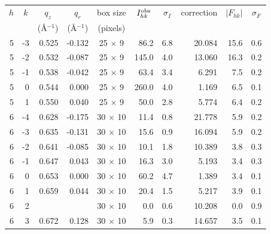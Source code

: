 \begin{table}[htbp]
  \centering
  \begin{tabular}{rrrrcrrrrr}
    \hline
    \multicolumn{1}{c}{$h$} & \multicolumn{1}{c}{$k$} & \multicolumn{1}{c}{$q_z$} & 
    \multicolumn{1}{c}{$q_r$} & \multicolumn{1}{c}{box size} & \multicolumn{1}{c}{$I_{hk}^\textrm{obs}$} & 
    \multicolumn{1}{c}{$\sigma_I$} & \multicolumn{1}{c}{correction} & \multicolumn{1}{c}{$|F_{hk}|$} &
    \multicolumn{1}{c}{$\sigma_F$} \\
     & & \multicolumn{1}{c}{(\AA$^{-1}$)} & \multicolumn{1}{c}{(\AA$^{-1}$)} & \multicolumn{1}{c}{(pixels)} & & & & \\ 
    \hline
  5        & -3       & 0.525    & -0.132   & 25 $\times$ 9  & 86.2     & 6.8      & 20.084    & 15.6     & 0.6 \\
  5        & -2       & 0.532    & -0.087   & 25 $\times$ 9  & 145.0    & 4.0      & 13.060    & 16.3     & 0.2 \\
  5        & -1       & 0.538    & -0.042   & 25 $\times$ 9  & 63.4     & 3.4      & 6.291     & 7.5      & 0.2 \\
  5        & 0        & 0.544    & 0.000    & 25 $\times$ 9  & 260.0    & 4.0      & 1.169     & 6.5      & 0.1 \\
  5        & 1        & 0.550    & 0.040    & 25 $\times$ 9  & 50.0     & 2.8      & 5.774     & 6.4      & 0.2 \\
  6        & -4       & 0.628    & -0.175   & 30 $\times$ 10 & 11.4     & 0.8      & 21.778    & 5.9      & 0.2 \\
  6        & -3       & 0.635    & -0.131   & 30 $\times$ 10 & 15.6     & 0.9      & 16.094    & 5.9      & 0.2 \\
  6        & -2       & 0.641    & -0.085   & 30 $\times$ 10 & 10.1     & 1.8      & 10.389    & 3.8      & 0.3 \\
  6        & -1       & 0.647    & 0.043    & 30 $\times$ 10 & 16.3     & 3.0      & 5.193     & 3.4      & 0.3 \\
  6        & 0        & 0.653    & 0.000    & 30 $\times$ 10 & 60.2     & 4.7      & 1.389     & 3.4      & 0.1 \\
  6        & 1        & 0.659    & 0.044    & 30 $\times$ 10 & 20.4     & 1.5      & 5.217     & 3.9      & 0.1 \\
  6        & 2        &          &          & 30 $\times$ 10 & 0.0      & 0.6      & 10.208    & 0.0      & 0.9 \\
  6        & 3        & 0.672    & 0.128    & 30 $\times$ 10 & 5.9      & 0.3      & 14.657    & 3.5      & 0.1 \\

\end{tabular}
\end{table}
